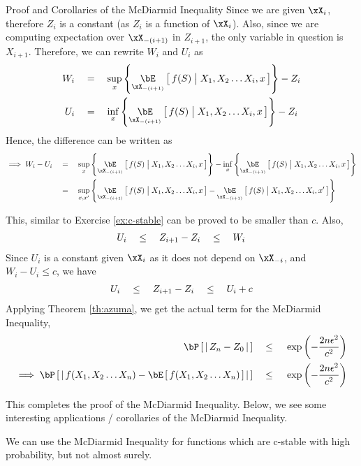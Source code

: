 \documentclass[11pt,a4paper]{article}
\begin{document}
\begin{ssection}{Proof and Corollaries of the McDiarmid Inequality}
	Since we are given $\xX_i$, therefore $Z_i$ is a constant (as $Z_i$ is a function of $\xX_i$). Also, since we are computing expectation over $\xX_{- (i + 1)}$ in $Z_{i + 1}$, the only variable in question is $X_{i + 1}$. Therefore, we can rewrite $W_i$ and $U_i$ as
	\begin{align*}
		W_i & \eq	\sup_{x} \set{\E[\xX_{-(i + 1)}]{f(S) \pipe X_1, X_2 \dots X_i, x}} - Z_i \\
		U_i & \eq	\inf_{x} \set{\E[\xX_{-(i + 1)}]{f(S) \pipe X_1, X_2 \dots X_i, x}} - Z_i 
	\end{align*}
	Hence, the difference can be written as
	\begin{align*}
		\implies W_i - U_i & \eq	\sup_{x} \set{\E[\xX_{-(i + 1)}]{f(S) \pipe X_1, X_2 \dots X_i, x}} - \inf_{x} \set{\E[\xX_{-(i + 1)}]{f(S) \pipe X_1, X_2 \dots X_i, x}} \\
		                   & \eq	\sup_{x, x'} \set{\E[\xX_{-(i + 1)}]{f(S) \pipe X_1, X_2 \dots X_i, x} - \E[\xX_{-(i + 1)}]{f(S) \pipe X_1, X_2 \dots X_i, x'}}           
	\end{align*}
	
	This, similar to Exercise \ref{ex:c-stable} can be proved to be smaller than $c$. Also,
	\begin{align*}
		U_i	\quad \le \quad	Z_{i + 1} - Z_i	\quad \le \quad	W_i 
	\end{align*}
	Since $U_i$ is a constant given $\xX_i$ as it does not depend on $\xX_{-i}$, and $W_i - U_i \le c$, we have
	\begin{align*}
		U_i	\quad \le \quad	Z_{i + 1} - Z_i	\quad \le \quad	U_i + c 
	\end{align*}
	Applying Theorem \ref{th:azuma}, we get the actual term for the McDiarmid Inequality, \ie
	\begin{align*}
		\prob{\abs{Z_n - Z_0}}	\qle	\texp{- \frac{2 n \epsilon^2}{c^2}}                                                  \\
		\implies \prob{\abs{f(X_1, X_2 \dots X_n) - \E{f(X_1, X_2 \dots X_n)}}}	\qle	\texp{- \frac{2 n \epsilon^2}{c^2}} 
	\end{align*}
	
	This completes the proof of the McDiarmid Inequality. Below, we see some interesting applications / corollaries of the McDiarmid Inequality. \br
	
	\begin{remark}
		We can use the McDiarmid Inequality for functions which are c-stable with high probability, but not almost surely.
	\end{remark} \br
	

\end{ssection}
\end{document}
